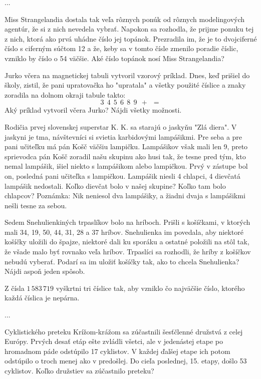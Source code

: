 ﻿{%
...}

{%
Miss Strangelandia dostala tak veľa rôznych ponúk
od rôznych modelingových agentúr, že si z nich nevedela
vybrať. Napokon sa rozhodla, že prijme ponuku tej z nich,
ktorá ako prvá uhádne číslo jej topánok. Prezradila im, že je
to dvojciferné číslo s ciferným súčtom 12 a že, keby sa v tomto čísle zmenilo poradie číslic,
vzniklo by číslo o 54 väčšie. Aké číslo topánok nosí Miss Strangelandia?}

{%
Jurko včera na magnetickej tabuli vytvoril vzorový príklad. Dnes, keď prišiel do školy, zistil,
že pani upratovačka ho "upratala" a všetky použité číslice a znaky zoradila na dolnom okraji
tabule takto:
$$
3\ \ 4\ \ 5\ \ 6\ \ 8\ \ 9\ \ {+}\ \ {=}
$$
Aký príklad vytvoril včera Jurko? Nájdi všetky možnosti.}

{%
Rodičia prvej slovenskej superstar K. K. sa starajú o jaskyňu "Zlá diera". V jaskyni je tma,
návštevníci si svietia karbidovými lampášikmi. Pre seba a pre pani učiteľku má pán Košč
väčšiu lampičku. Lampášikov však mali len 9, preto sprievodca pán Košč zoradil našu skupinu
ako husi tak, že tesne pred tým, kto nemal lampášik, išiel niekto s lampášikom alebo
lampičkou. Prvý v zástupe bol on, posledná pani učiteľka s lampičkou. Lampášik niesli 4
chlapci, 4 dievčatá lampášik nedostali. Koľko dievčat bolo v našej skupine? Koľko tam bolo
chlapcov? Poznámka: Nik neniesol dva lampášiky, a žiadni dvaja s lampášikmi nešli tesne za
sebou.}

{%
Sedem Snehulienkiných trpaslíkov bolo na hríboch. Prišli s košíčkami, v ktorých mali 34, 19,
50, 44, 31, 28 a 37 hríbov. Snehulienka im povedala, aby niektoré košíčky uložili do špajze,
niektoré dali ku sporáku a ostatné položili na stôl tak, že všade malo byť rovnako veľa hríbov.
Trpaslíci sa rozhodli, že hríby z košíčkov nebudú vyberať. Podarí sa im uložiť košíčky tak, ako
to chcela Snehulienka? Nájdi aspoň jeden spôsob.}

{%
Z čísla $1\,583\,719$ vyškrtni tri číslice tak, aby vzniklo čo najväčšie číslo, ktorého každá číslica je
nepárna.}

{%
...}

{%
Cyklistického preteku Krížom-krážom sa zúčastnili šesťčlenné družstvá z celej Európy.
Prvých desať etáp ešte zvládli všetci, ale v jedenástej etape po hromadnom páde odstúpilo 17
cyklistov. V každej ďalšej etape ich potom odstúpilo o troch menej ako v predošlej. Do cieľa
poslednej, 15. etapy, došlo 53 cyklistov. Koľko družstiev sa zúčastnilo preteku?}

